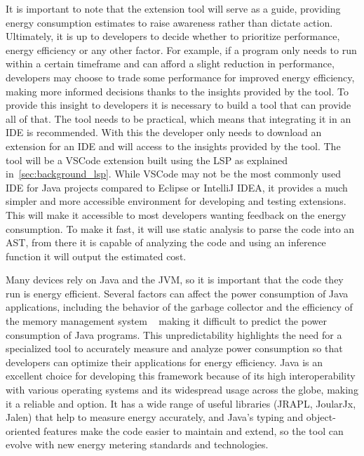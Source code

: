 It is important to note that the extension tool will serve as a guide, providing energy consumption estimates to raise awareness rather than dictate action. Ultimately, it is up to developers to decide whether to prioritize performance, energy efficiency or any other factor. For example, if a program only needs to run within a certain timeframe and can afford a slight reduction in performance, developers may choose to trade some performance for improved energy efficiency, making more informed decisions thanks to the insights provided by the tool.
To provide this insight to developers it is necessary to build a tool that can provide all of that. The tool needs to be practical, which means that integrating it in an IDE is recommended. With this the developer only needs to download an extension for an IDE and will access to the insights provided by the tool.
The tool will be a VSCode extension  built using the LSP as explained in~\ref{sec:background_lsp}. While VSCode may not be the most commonly used IDE for Java projects compared to Eclipse or IntelliJ IDEA, it provides a much simpler and more accessible environment for developing and testing extensions. This will make it accessible to most developers wanting feedback on the energy consumption. To make it fast, it will use static analysis to parse the code into an AST, from there it is capable of analyzing the code and using an inference function it will output the estimated cost.




Many devices rely on Java and the JVM, so it is important that the code they run is energy efficient. Several factors can affect the power consumption of Java applications, including the behavior of the garbage collector and the efficiency of the memory management system ~\cite{10.5555/1267847.1267870} making it difficult to predict the power consumption of Java programs. This unpredictability highlights the need for a specialized tool to accurately measure and analyze power consumption so that developers can optimize their applications for energy efficiency.
Java is an excellent choice for developing this framework because of its high interoperability with various operating systems and its widespread usage across the globe, making it a reliable and option. It has a wide range of useful libraries (JRAPL, JoularJx, Jalen) that help to measure energy accurately, and Java's typing and object-oriented features make the code easier to maintain and extend, so the tool can evolve with new energy metering standards and technologies.


